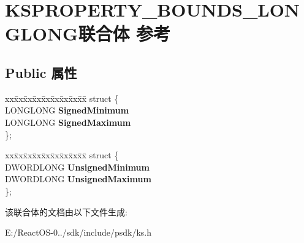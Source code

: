 \hypertarget{union_k_s_p_r_o_p_e_r_t_y___b_o_u_n_d_s___l_o_n_g_l_o_n_g}{}\section{K\+S\+P\+R\+O\+P\+E\+R\+T\+Y\+\_\+\+B\+O\+U\+N\+D\+S\+\_\+\+L\+O\+N\+G\+L\+O\+N\+G联合体 参考}
\label{union_k_s_p_r_o_p_e_r_t_y___b_o_u_n_d_s___l_o_n_g_l_o_n_g}
\subsection*{Public 属性}
\begin{DoxyCompactItemize}
\item 
\mbox{\label{union_k_s_p_r_o_p_e_r_t_y___b_o_u_n_d_s___l_o_n_g_l_o_n_g_aa2c06b6ce37ad3a32b95b48c3a71a3a1}} 
\begin{tabbing}
xx\=xx\=xx\=xx\=xx\=xx\=xx\=xx\=xx\=\kill
struct \{\\
\>LONGLONG {\bfseries SignedMinimum}\\
\>LONGLONG {\bfseries SignedMaximum}\\
\}; \\

\end{tabbing}\item 
\mbox{\label{union_k_s_p_r_o_p_e_r_t_y___b_o_u_n_d_s___l_o_n_g_l_o_n_g_adb817abb5214eeaed3cb14936a18f7c6}} 
\begin{tabbing}
xx\=xx\=xx\=xx\=xx\=xx\=xx\=xx\=xx\=\kill
struct \{\\
\>DWORDLONG {\bfseries UnsignedMinimum}\\
\>DWORDLONG {\bfseries UnsignedMaximum}\\
\}; \\

\end{tabbing}\end{DoxyCompactItemize}


该联合体的文档由以下文件生成\+:\begin{DoxyCompactItemize}
\item 
E\+:/\+React\+O\+S-\/0../sdk/include/psdk/ks.\+h\end{DoxyCompactItemize}
